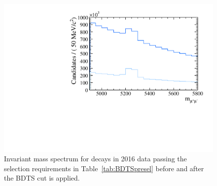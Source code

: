 \begin{figure}
    \centering
        \includegraphics[width=\textwidth]{./Figs/Selection/2016_BDTS_impact.pdf}
    \caption{Invariant mass spectrum for \bhh decays in 2016 data passing the selection requirements in Table~\ref{tab:BDTSpresel} before and after the BDTS cut is applied.}
    \label{fig:BDTSpreformance}
\end{figure}

